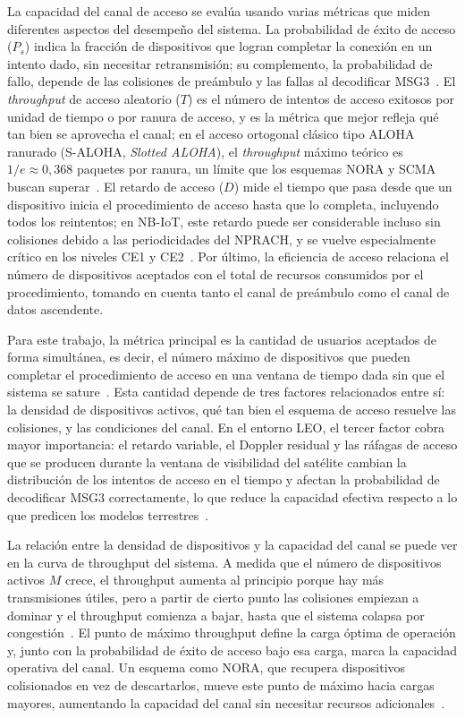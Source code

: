 La capacidad del canal de acceso se evalúa usando varias métricas que miden diferentes
aspectos del desempeño del sistema. La probabilidad de éxito de acceso ($P_s$)
indica la fracción de dispositivos que logran completar la conexión en un intento dado, sin
necesitar retransmisión; su complemento, la probabilidad de fallo, depende de las colisiones
de preámbulo y las fallas al decodificar MSG3~\cite{ref5, ref9}. El
\textit{throughput} de acceso aleatorio ($T$) es el número de intentos de acceso
exitosos por unidad de tiempo o por ranura de acceso, y es la métrica que mejor refleja qué
tan bien se aprovecha el canal; en el acceso ortogonal clásico tipo ALOHA ranurado (S-ALOHA,
\textit{Slotted ALOHA}), el \textit{throughput} máximo teórico es $1/e \approx 0{,}368$
paquetes por ranura, un límite que los esquemas NORA y SCMA buscan superar~\cite{ref5}. El
retardo de acceso ($D$) mide el tiempo que pasa desde que un dispositivo inicia el
procedimiento de acceso hasta que lo completa, incluyendo todos los reintentos; en NB-IoT,
este retardo puede ser considerable incluso sin colisiones debido a las periodicidades del
NPRACH, y se vuelve especialmente crítico en los niveles CE1 y CE2~\cite{ref4}. Por último, la
eficiencia de acceso relaciona el número de dispositivos aceptados con el total de
recursos consumidos por el procedimiento, tomando en cuenta tanto el canal de preámbulo como
el canal de datos ascendente.

Para este trabajo, la métrica principal es la cantidad de usuarios aceptados de forma
simultánea, es decir, el número máximo de dispositivos que pueden completar el procedimiento de acceso
en una ventana de tiempo dada sin que el sistema se sature~\cite{ref5}. Esta cantidad depende
de tres factores relacionados entre sí: la densidad de dispositivos activos, qué tan bien el
esquema de acceso resuelve las colisiones, y las condiciones del canal. En el entorno LEO,
el tercer factor cobra mayor importancia: el retardo variable, el Doppler residual y las
ráfagas de acceso que se producen durante la ventana de visibilidad del satélite cambian la
distribución de los intentos de acceso en el tiempo y afectan la probabilidad de decodificar
MSG3 correctamente, lo que reduce la capacidad efectiva respecto a lo que predicen los
modelos terrestres~\cite{ref8, ref7}.

La relación entre la densidad de dispositivos y la capacidad del canal se puede ver en la
curva de throughput del sistema. A medida que el número de dispositivos activos $M$
crece, el throughput aumenta al principio porque hay más transmisiones útiles, pero
a partir de cierto punto las colisiones empiezan a dominar y el throughput comienza
a bajar, hasta que el sistema colapsa por congestión~\cite{ref6}. El punto de máximo
throughput define la carga óptima de operación y, junto con la probabilidad de éxito
de acceso bajo esa carga, marca la capacidad operativa del canal. Un esquema como NORA, que
recupera dispositivos colisionados en vez de descartarlos, mueve este punto de máximo hacia
cargas mayores, aumentando la capacidad del canal sin necesitar recursos
adicionales~\cite{ref5, ref6}.